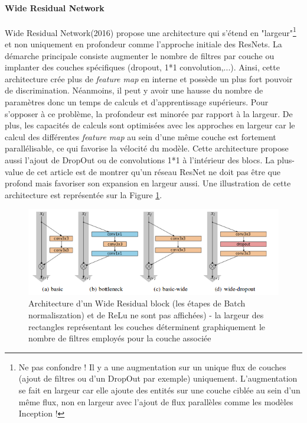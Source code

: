 \paragraph{Wide Residual Network}

\noindent Wide Residual Network\cite{wideres}(2016) propose une architecture qui s'étend en "largeur"\footnote{Ne pas confondre ! Il y a une augmentation sur un unique flux de couches (ajout de filtres ou d'un DropOut par exemple) uniquement. L'augmentation se fait en largeur car elle ajoute des entités sur une couche ciblée au sein d'un même flux, non en largeur avec l'ajout de flux parallèles comme les modèles Inception !} et non uniquement en profondeur comme l'approche initiale des ResNets. La démarche principale consiste augmenter le nombre de filtres par couche ou implanter des couches spécifiques (dropout, 1*1 convolution,...). Ainsi, cette architecture crée plus de \textit{feature map} en interne et possède un plus fort pouvoir de discrimination. Néanmoins, il peut y avoir une hausse du nombre de paramètres donc un temps de calculs et d'apprentissage supérieurs. Pour s'opposer à ce problème, la profondeur est minorée par rapport à la largeur. De plus, les capacités de calculs sont optimisées avec les approches en largeur car le calcul des différentes \textit{feature map} au sein d'une même couche est fortement parallélisable, ce qui favorise la vélocité du modèle. Cette architecture propose aussi l'ajout de DropOut ou de convolutions 1*1 à l'intérieur des blocs. La plus-value de cet article est de montrer qu'un réseau ResNet ne doit pas être que profond mais favoriser son expansion en largeur aussi. Une illustration de cette architecture est représentée sur la Figure \ref{wide}.

\begin{figure}
    \centering
    \includegraphics[scale=0.4]{./tex/convolution-network/classifier/wideresnet.png}
    \caption{Architecture d'un Wide Residual block (les étapes de Batch normaliszation) et de ReLu ne sont pas affichées) - la largeur des rectangles représentant les couches déterminent graphiquement le nombre de filtres employés pour la couche associée}
    \label{wide}
\end{figure}

